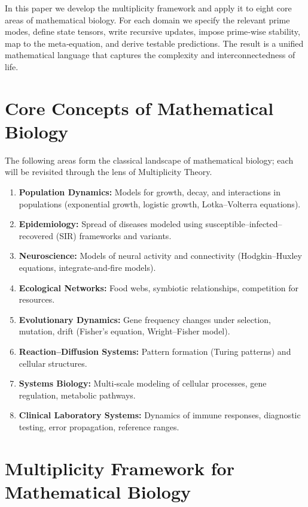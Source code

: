 \documentclass[11pt]{article}
\begin{document}
In this paper we develop the multiplicity framework and apply it to eight core areas of mathematical biology. For each domain we specify the relevant prime modes, define state tensors, write recursive updates, impose prime‑wise stability, map to the meta‑equation, and derive testable predictions. The result is a unified mathematical language that captures the complexity and interconnectedness of life.

\section{Core Concepts of Mathematical Biology}
\label{sec:core}

The following areas form the classical landscape of mathematical biology; each will be revisited through the lens of Multiplicity Theory.

\begin{enumerate}
    \item \textbf{Population Dynamics:} Models for growth, decay, and interactions in populations (exponential growth, logistic growth, Lotka–Volterra equations).
    \item \textbf{Epidemiology:} Spread of diseases modeled using susceptible–infected–recovered (SIR) frameworks and variants.
    \item \textbf{Neuroscience:} Models of neural activity and connectivity (Hodgkin–Huxley equations, integrate‑and‑fire models).
    \item \textbf{Ecological Networks:} Food webs, symbiotic relationships, competition for resources.
    \item \textbf{Evolutionary Dynamics:} Gene frequency changes under selection, mutation, drift (Fisher’s equation, Wright–Fisher model).
    \item \textbf{Reaction–Diffusion Systems:} Pattern formation (Turing patterns) and cellular structures.
    \item \textbf{Systems Biology:} Multi‑scale modeling of cellular processes, gene regulation, metabolic pathways.
    \item \textbf{Clinical Laboratory Systems:} Dynamics of immune responses, diagnostic testing, error propagation, reference ranges.
\end{enumerate}

\section{Multiplicity Framework for Mathematical Biology}
\label{sec:framework}
\end{document}
